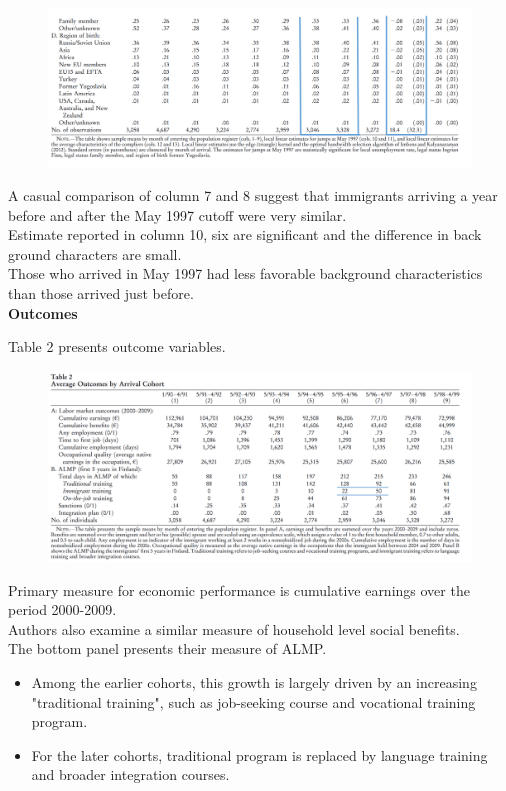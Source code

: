 \documentclass[../root]{subfiles}
\begin{document}
    \begin{figure}[h]
        \includegraphics[width=14cm]{0703sugiyama/Table12.png}
    \end{figure}
    
    A casual comparison of column 7 and 8 suggest that immigrants arriving a year before and after the May 1997 cutoff were very similar.  \\
    
    Estimate reported in column 10, six are significant and the difference in back ground characters are small. \\
    Those who arrived in May 1997 had less favorable background characteristics than those arrived just before. \\
    
    {\bf Outcomes}
    
    Table 2 presents outcome variables.
    \begin{figure}[h]
        \includegraphics[width=14cm]{0703sugiyama/Table2.png}
    \end{figure}
    
    Primary measure for economic performance is cumulative earnings over the period 2000-2009. \\
    Authors also examine a similar measure of household level social benefits. \\
    The bottom panel presents their measure of ALMP. \\
    \begin{itemize}
        \item Among the earlier cohorts, this growth is largely driven by an increasing "traditional training", such as job-seeking course and vocational training program.
        \item For the later cohorts, traditional program is replaced by language training and broader integration courses.
    \end{itemize}
    
\end{document}
